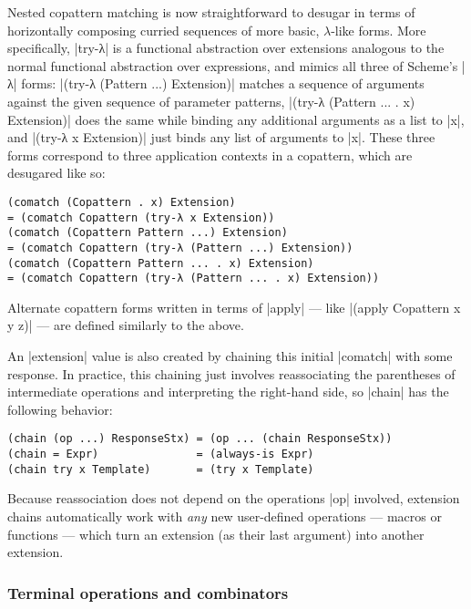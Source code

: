 Nested copattern matching is now straightforward to desugar in terms of horizontally composing curried sequences of more basic, $\lambda$-like forms.
More specifically, \scm|try-λ| is a functional abstraction over extensions analogous to the normal functional abstraction over expressions, and mimics all three of Scheme's \scm|λ| forms:
\scm|(try-λ (Pattern ...) Extension)| matches a sequence of arguments against the given sequence of parameter patterns,
\scm|(try-λ (Pattern ... . x) Extension)| does the same while binding any additional arguments as a list to \scm|x|, and
\scm|(try-λ x Extension)| just binds any list of arguments to \scm|x|.
These three forms correspond to three application contexts in a copattern, which are desugared like so:
\begin{verbatim}
(comatch (Copattern . x) Extension)
= (comatch Copattern (try-λ x Extension))
(comatch (Copattern Pattern ...) Extension)
= (comatch Copattern (try-λ (Pattern ...) Extension))
(comatch (Copattern Pattern ... . x) Extension)
= (comatch Copattern (try-λ (Pattern ... . x) Extension))
\end{verbatim}
Alternate copattern forms written in terms of \scm|apply| --- like \scm|(apply Copattern x y z)| --- are defined similarly to the above.

An \scm|extension| value is also created by chaining this initial \scm|comatch| with some response.
In practice, this chaining just involves reassociating the parentheses of intermediate operations and interpreting the right-hand side, so \scm|chain| has the following behavior:
\begin{verbatim}
(chain (op ...) ResponseStx) = (op ... (chain ResponseStx))
(chain = Expr)               = (always-is Expr)
(chain try x Template)       = (try x Template)
\end{verbatim}
Because reassociation does not depend on the operations \scm|op| involved, extension chains automatically work with \emph{any} new user-defined operations --- macros or functions --- which turn an extension (as their last argument) into another extension.

\subsubsection{Terminal operations and combinators}

